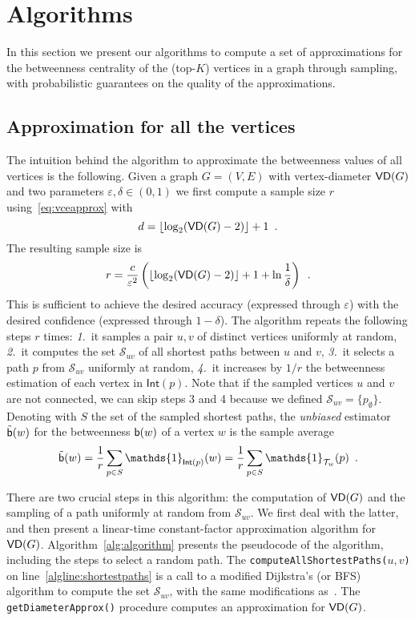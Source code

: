 \section{Algorithms}\label{sec:centrsamplalgo}
In this section we present our algorithms to compute a set of approximations for the
betweenness centrality of the (top-$K$) vertices in a graph through sampling,
with probabilistic guarantees on the quality of the approximations.

\subsection{Approximation for all the vertices}\label{sec:centrsamplallvertapprox}
The intuition behind the algorithm to approximate the betweenness values of all
vertices is the following. Given a graph $G=(V,E)$
with vertex-diameter $\mathsf{VD}(G)$ and two parameters $\varepsilon,\delta\in(0,1)$
we first compute a sample size $r$ using~\eqref{eq:vceapprox} with
\[d=\lfloor\log_2(\mathsf{VD}(G)-2)\rfloor+1\enspace.\]
The resulting sample size is
\begin{equation}\label{eq:centrsamplsamplesize}
r=\frac{c}{\varepsilon^2}\left(\lfloor\log_2(\mathsf{VD}(G)-2)\rfloor+1+\ln\frac{1}{\delta}\right)\enspace.
\end{equation}
This is sufficient to achieve the desired accuracy
(expressed through $\varepsilon$) with the desired confidence (expressed through
$1-\delta$). The algorithm repeats the following steps $r$ times:
\emph{1.}~it samples a pair $u,v$ of distinct vertices uniformly at random,
\emph{2.}~it
computes the set $\mathcal{S}_{uv}$ of all shortest paths between $u$ and $v$,
\emph{3.}~it selects a path $p$ from $\mathcal{S}_{uv}$ uniformly at random,
\emph{4.}~it increases by $1/r$ the betweenness estimation of each vertex in
$\mathsf{Int}(p)$. Note that if the sampled vertices $u$ and $v$ are not
connected, we can skip steps 3 and 4 because we defined
$\mathcal{S}_{uv}=\{p_\emptyset\}$. Denoting with $S$ the set of the sampled
shortest paths, the \emph{unbiased} estimator $\tilde{\mathsf{b}}(w)$ for the betweenness
$\mathsf{b}(w)$ of a vertex $w$ is the sample average 
\[
\tilde\betw(w) = \frac{1}{r}\sum_{p\in S}
\mathds{1}_{\mathsf{Int}(p)}(w) = \frac{1}{r}\sum_{p\in S}
\mathds{1}_{\mathcal{T}_w}(p)\enspace.
\]

There are two crucial steps in this algorithm: the computation of $\mathsf{VD}(G)$ and
the sampling of a path uniformly at random from $\mathcal{S}_{uv}$. We first
deal with the latter, and then present a linear-time constant-factor approximation algorithm for $\mathsf{VD}(G)$.
Algorithm~\ref{alg:algorithm} presents the pseudocode of the algorithm,
including the steps to select a random path.  The
\texttt{computeAllShortestPaths(}$u,v$\texttt{)}  on
line~\ref{algline:shortestpaths} is a call to a modified Dijkstra's (or BFS)
algorithm to compute the set $\mathcal{S}_{uv}$, with the same modifications
as~\citep{Brandes01}. The \texttt{getDiameterApprox()} procedure computes an approximation for $\mathsf{VD}(G)$. %

